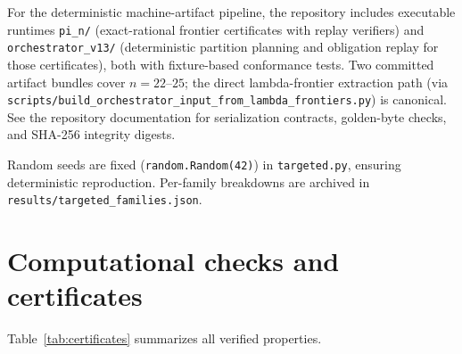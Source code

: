 \documentclass[12pt,oneside]{article}
\theoremstyle{remark}
\begin{document}
For the deterministic machine-artifact pipeline, the repository includes executable runtimes
\texttt{pi\_n/} (exact-rational frontier certificates with replay verifiers) and \texttt{orchestrator\_v13/} (deterministic partition planning and obligation replay for those certificates), both with fixture-based conformance tests.
Two committed artifact bundles cover $n = 22$--$25$; the direct lambda-frontier extraction path (via \texttt{scripts/build\_orchestrator\_input\_from\_lambda\_frontiers.py}) is canonical.
See the repository documentation for serialization contracts, golden-byte checks, and SHA-256 integrity digests.

Random seeds are fixed (\texttt{random.Random(42)}) in \texttt{targeted.py}, ensuring deterministic reproduction.
Per-family breakdowns are archived in \texttt{results/targeted\_families.json}.

\clearpage
\section{Computational checks and certificates}\label{app:certificates}

Table~\ref{tab:certificates} summarizes all verified properties.
\end{document}
